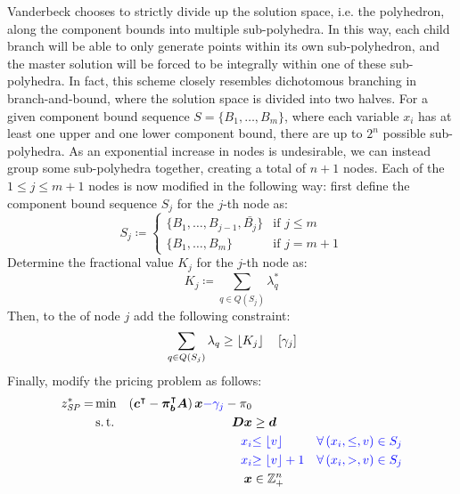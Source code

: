 Vanderbeck chooses to strictly divide up the solution space, i.e. the polyhedron, along the component bounds into multiple sub-polyhedra. In this way, each child branch will be able to only generate points within its own sub-polyhedron, and the master solution will be forced to be integrally within one of these sub-polyhedra. In fact, this scheme closely resembles dichotomous branching in branch-and-bound, where the solution space is divided into two halves. For a given component bound sequence $S = \{B_1, \dots, B_m\}$, where each variable $x_i$ has at least one upper and one lower component bound, there are up to $2^n$ possible sub-polyhedra. As an exponential increase in nodes is undesirable, we can instead group some sub-polyhedra together, creating a total of $n + 1$ nodes. Each of the $1 \leq j \leq m+1$ nodes is now modified in the following way: first define the component bound sequence $S_j$ for the $j$-th node as:
\begin{equation}
S_j \coloneqq
\begin{cases}
\{B_1, \dots, B_{j-1}, \bar{B_j}\} & \text{if } j \leq m \\
\{B_1, \dots, B_m\} & \text{if } j = m+1
\end{cases}
\end{equation}
Determine the fractional value $K_j$ for the $j$-th node as:
\begin{equation}
K_j \coloneqq \sum_{q \in Q(S_j)} \lambda_q^*
\end{equation}
Then, to the \RMP{} of node $j$ add the following constraint:
\begin{equation}
\sum_{q \in Q(S_j)} \lambda_q \geq \lfloor K_j\rfloor \quad \left[\gamma_j\right]
\end{equation}
Finally, modify the pricing problem as follows:
\begin{equation}
\begin{aligned}
z^*_\SP{} = &\min & \left( \vec{c}\transpose - \vec{\pi}_\vec{b}\transpose \mat{A} \right) \vec{x} {\color{blue} - \gamma_j} - \pi_0 & \\
&\st & \mat{D} \vec{x} & \geq \vec{d} \\
&& {\color{blue} x_i} & {\color{blue} \leq \floor{v}} & {\color{blue} \forall \left( x_i, \leq, v \right) \in S_j} \\
&& {\color{blue} x_i} & {\color{blue} \geq \floor{v} + 1} & {\color{blue} \forall \left( x_i, >, v \right) \in S_j} \\
&& \vec{x} & \in \mathbb{Z}_+^n
\end{aligned}
\end{equation}

